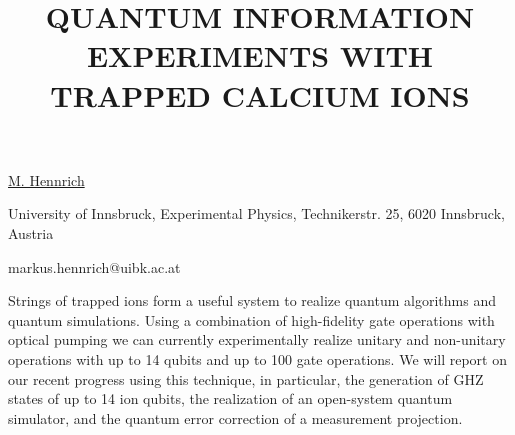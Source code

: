 \title{QUANTUM INFORMATION EXPERIMENTS WITH TRAPPED CALCIUM IONS}

\underline{M. Hennrich} 

{\normalsize{\vspace{-4mm}
University of Innsbruck,
Experimental Physics,
Technikerstr. 25,
6020 Innsbruck,
Austria

\email markus.hennrich@uibk.ac.at}}

Strings of trapped ions form a useful system to realize quantum algorithms and quantum simulations. Using a combination of high-fidelity gate operations with optical pumping we can currently experimentally realize unitary and non-unitary operations with up to 14 qubits and up to 100 gate operations. We will report on our recent progress using this technique, in particular, the generation of GHZ states of up to 14 ion qubits, the realization of an open-system quantum simulator, and the quantum error correction of a measurement projection.

\vspace{\baselineskip} 